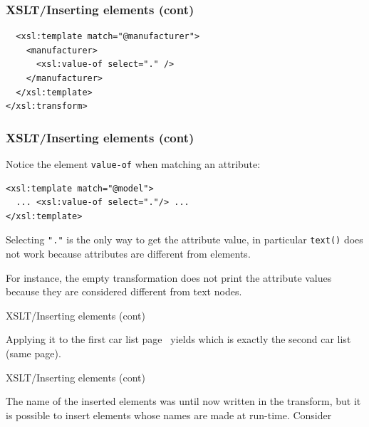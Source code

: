%
\begin{frame}[containsverbatim]
\frametitle{XSLT/Inserting elements (cont)}

{\small
\begin{verbatim}
  <xsl:template match="@manufacturer">
    <manufacturer>
      <xsl:value-of select="." />
    </manufacturer>
  </xsl:template>
</xsl:transform>
\end{verbatim}
}

\end{frame}

%
\begin{frame}[containsverbatim]
\frametitle{XSLT/Inserting elements (cont)}

Notice the \XSLT element \texttt{value-of} when matching an
attribute:
{\small
\begin{verbatim}
<xsl:template match="@model">
  ... <xsl:value-of select="."/> ...
</xsl:template>
\end{verbatim}
}
Selecting \verb|"."| is the only way to get the attribute value, in
particular \verb|text()| does not work because attributes are
different from elements.

\bigskip

For instance, the empty transformation does not print the attribute
values because they are considered different from text nodes.

\end{frame}

%
\begin{frame}{XSLT/Inserting elements (cont)}

Applying it to the first car list page~\pageref{cars} yields
 which is exactly the second car
list (same page).

\end{frame}

%
\begin{frame}{XSLT/Inserting elements (cont)}

The name of the inserted elements was until now written in the
transform, but it is possible to insert elements whose names are made
at run-time. Consider

\end{frame}


